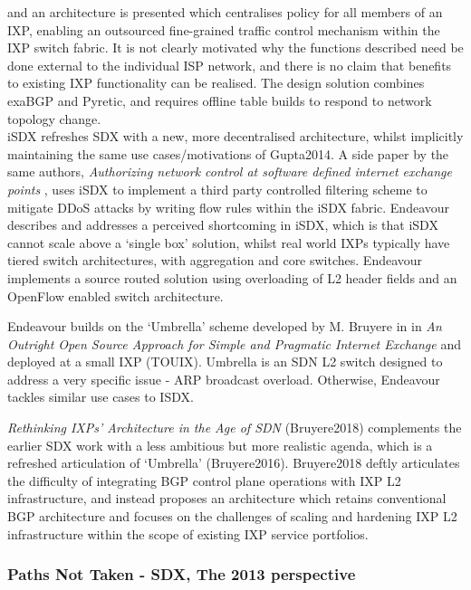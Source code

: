 and an architecture is presented which centralises policy for all members of an IXP, enabling an outsourced fine-grained traffic control mechanism within the IXP switch fabric.
It is not clearly motivated why the functions described need be done external to the individual ISP network, and there is no claim that benefits to existing IXP functionality can be realised.
The design solution combines exaBGP and Pyretic, and requires offline table builds to respond to network topology change.
\\
iSDX \cite{Gupta2016} refreshes SDX with a new, more decentralised architecture, whilst implicitly maintaining the same use cases/motivations of Gupta2014.
A side paper by the same authors, \textit{Authorizing network control at software defined internet exchange points} \cite{Gupta2016a}, uses iSDX to implement a third party controlled filtering scheme to mitigate DDoS attacks by writing flow rules within the iSDX fabric.
Endeavour \cite{Antichi2017} describes and addresses a perceived shortcoming in iSDX, which is that iSDX cannot scale above a `single box' solution, whilst real world IXPs typically have tiered switch architectures, with aggregation and core switches.
Endeavour implements a source routed solution using overloading of L2 header fields and an OpenFlow enabled switch architecture.

Endeavour builds on the `Umbrella' scheme developed by M. Bruyere in \cite{Bruyere2016} in \textit{An Outright Open Source Approach for Simple and Pragmatic Internet Exchange} and deployed at a small IXP (TOUIX).
Umbrella is an SDN L2 switch designed to address a very specific issue - ARP broadcast overload.
Otherwise, Endeavour tackles similar use cases to ISDX.

\textit{Rethinking IXPs' Architecture in the Age of SDN} (Bruyere2018) complements the earlier SDX work with a less ambitious but more realistic agenda, which is a refreshed articulation of `Umbrella' (Bruyere2016).
Bruyere2018 deftly articulates the difficulty of integrating BGP control plane operations with IXP L2 infrastructure, and instead proposes an architecture which retains conventional BGP architecture and focuses on the challenges of scaling and hardening IXP L2 infrastructure within the scope of existing IXP service portfolios.

\subsubsection{Paths Not Taken - SDX, The 2013 perspective}

